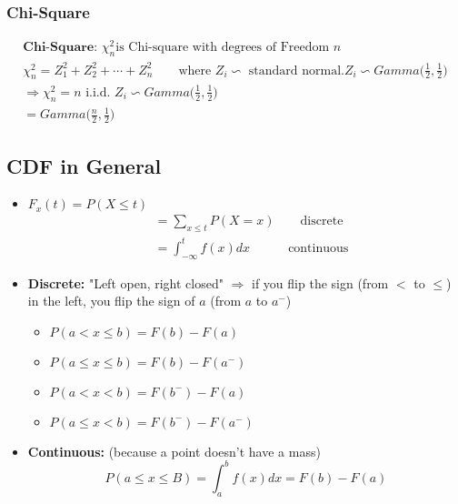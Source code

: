 \subsubsection*{Chi-Square}
\begin{gather*}
	\textbf{Chi-Square: } \chi^2_n \text{is Chi-square with degrees of Freedom }n\\
	\chi^2_n = Z_1^2 + Z_2^2 + \cdots + Z_n^2 \quad \quad \text{where $Z_i \backsim$ standard normal}. Z_i \backsim Gamma\bigg(\frac{1}{2},\frac{1}{2}\bigg)\\
	\Rightarrow \chi^2_n = n \text{ i.i.d. } Z_i \backsim Gamma\bigg(\frac{1}{2},\frac{1}{2}\bigg)\\
	= Gamma\bigg(\frac{n}{2},\frac{1}{2}\bigg)
\end{gather*}
\subsection*{CDF in General}
\begin{itemize}
	\item $F_x(t) = P(X \leq t)$
	\begin{align*}
		& = \sum\limits_{x \leq t} P(X = x) \quad \quad \text{discrete}\\
		& = \int_{-\infty}^{t} f(x) dx \quad \quad \quad \text{continuous}
	\end{align*}
	\item \textbf{Discrete: } "Left open, right closed" $\Rightarrow$ if you flip the sign (from $<$ to $\leq$) in the left, you flip the sign of $a$ (from $a$ to $a^-$)
	\begin{itemize}[label={--}]
		\item $P(a < x \leq b) = F(b) - F(a)$
		\item $P(a \leq x \leq b) = F(b) - F(a^-)$
		\item $P(a < x < b) = F(b^-) - F(a)$
		\item $P(a \leq x < b) = F(b^-) - F(a^-)$
	\end{itemize}
	\item \textbf{Continuous: } (because a point doesn't have a mass)
	\begin{equation*}
		P(a \leq x \leq B) = \int_a^b f(x) dx = F(b) - F(a)
	\end{equation*}
\end{itemize}
